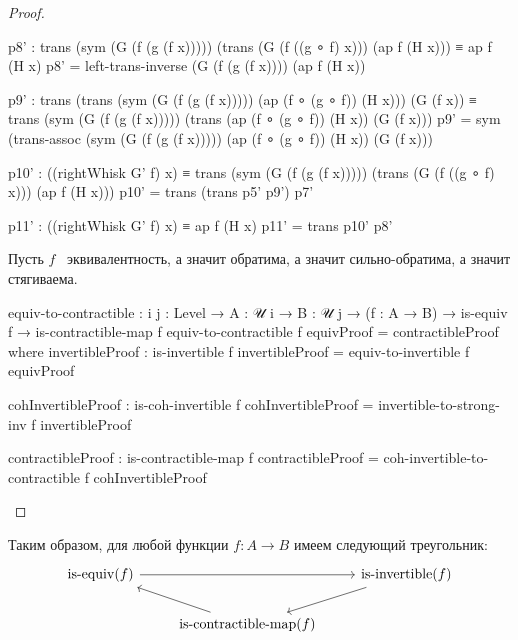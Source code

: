 \documentclass{article}[12pt]
\newcommand{\dash}{\textemdash\ }
\newcommand{\op}{\operatorname}
\begin{document}
\begin{proof}
\begin{code}
                p8' : trans (sym (G (f (g (f x))))) (trans (G (f ((g ∘ f) x))) (ap f (H x)))
                    ≡ ap f (H x)
                p8' = left-trans-inverse (G (f (g (f x)))) (ap f (H x))

                p9' : trans (trans (sym (G (f (g (f x))))) (ap (f ∘ (g ∘ f)) (H x))) (G (f x))
                    ≡ trans (sym (G (f (g (f x))))) (trans (ap (f ∘ (g ∘ f)) (H x)) (G (f x)))
                p9' = sym 
                    (trans-assoc (sym (G (f (g (f x))))) (ap (f ∘ (g ∘ f)) (H x)) (G (f x)))

                p10' : ((rightWhisk G' f) x)
                     ≡ trans (sym (G (f (g (f x))))) (trans (G (f ((g ∘ f) x))) (ap f (H x)))
                p10' = trans (trans p5' p9') p7'

                p11' : ((rightWhisk G' f) x) ≡ ap f (H x)
                p11' = trans p10' p8'
\end{code}

Пусть $f$ \dash эквивалентность, а значит обратима, а значит сильно-обратима, а значит стягиваема.
\begin{code}
equiv-to-contractible : {i j : Level} → {A : 𝒰 i} → {B : 𝒰 j}
                        → (f : A → B)
                        → is-equiv f
                        → is-contractible-map f
equiv-to-contractible f equivProof = contractibleProof
    where
        invertibleProof : is-invertible f
        invertibleProof = equiv-to-invertible f equivProof

        cohInvertibleProof : is-coh-invertible f
        cohInvertibleProof = invertible-to-strong-inv f invertibleProof

        contractibleProof : is-contractible-map f
        contractibleProof = coh-invertible-to-contractible f cohInvertibleProof
\end{code}
\end{proof}
Таким образом, для любой функции $f : A \rightarrow B$ имеем следующий треугольник:
$$
\begin{tikzcd}
    \op{is-equiv}(f) \arrow[rr] & & \arrow[dl] \op{is-invertible}(f) \\
    & \arrow[ul] \op{is-contractible-map}(f) &
\end{tikzcd}
$$
\end{document}

